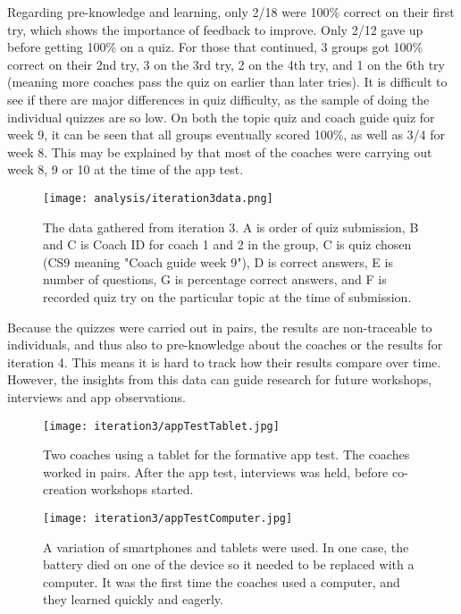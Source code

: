   Regarding pre-knowledge and learning, only 2/18 were 100\% correct on their first try, which shows the importance of feedback to improve. Only 2/12 gave up before getting 100\% on a quiz. For those that continued, 3 groups got 100\% correct on their 2nd try, 3 on the 3rd try, 2 on the 4th try, and 1 on the 6th try (meaning more coaches pass the quiz on earlier than later tries). It is difficult to see if there are major differences in quiz difficulty, as the sample of doing the individual quizzes are so low. On both the topic quiz and coach guide quiz for week 9, it can be seen that all groups eventually scored 100\%, as well as 3/4 for week 8. This may be explained by that most of the coaches were carrying out week 8, 9 or 10 at the time of the app test.

  \begin{figure}[h]
    \centering
    \texttt{[image: analysis/iteration3data.png]}
    \caption{The data gathered from iteration 3. A is order of quiz submission, B and C is Coach ID for coach 1 and 2 in the group, C is quiz chosen (CS9 meaning "Coach guide week 9"), D is correct answers, E is number of questions, G is percentage correct answers, and F is recorded quiz try on the particular topic at the time of submission.}
    \label{fig:iteration3data}
  \end{figure}

  Because the quizzes were carried out in pairs, the results are non-traceable to individuals, and thus also to pre-knowledge about the coaches or the results for iteration 4. This means it is hard to track how their results compare over time. However, the insights from this data can guide research for future workshops, interviews and app observations. %

  \begin{figure}[h]
    \centering
    \texttt{[image: iteration3/appTestTablet.jpg]}
    \caption{Two coaches using a tablet for the formative app test. The coaches worked in pairs. After the app test, interviews was held, before co-creation workshops started.}
    \label{fig:tabletTest}
  \end{figure}

  \begin{figure}[h]
    \centering
    \texttt{[image: iteration3/appTestComputer.jpg]}
    \caption{A variation of smartphones and tablets were used. In one case, the battery died on one of the device so it needed to be replaced with a computer. It was the first time the coaches used a computer, and they learned quickly and eagerly.}
    \label{fig:computerTest}
  \end{figure}


